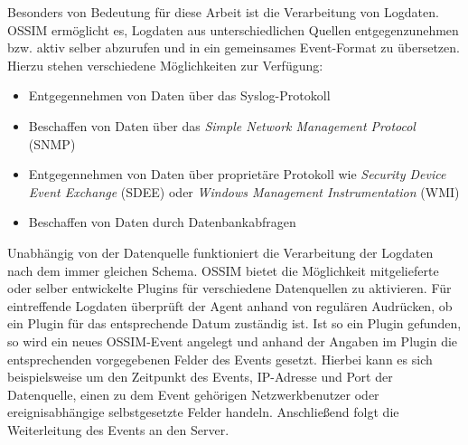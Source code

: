 \label{subsec_state_siem_parsing}

Besonders von Bedeutung für diese Arbeit ist die Verarbeitung von Logdaten. OSSIM ermöglicht es, Logdaten aus unterschiedlichen Quellen entgegenzunehmen bzw. aktiv selber abzurufen und in ein gemeinsames Event-Format zu übersetzen. Hierzu stehen verschiedene Möglichkeiten zur Verfügung:

\begin{itemize}
  \item Entgegennehmen von Daten über das Syslog-Protokoll
  \item Beschaffen von Daten über das \textit{Simple Network Management Protocol} (SNMP)
  \item Entgegennehmen von Daten über proprietäre Protokoll wie \textit{Security Device Event Exchange} (SDEE) oder \textit{Windows Management Instrumentation} (WMI)
  \item Beschaffen von Daten durch Datenbankabfragen 
\end{itemize}

Unabhängig von der Datenquelle funktioniert die Verarbeitung der Logdaten nach dem immer gleichen Schema. OSSIM bietet die Möglichkeit mitgelieferte oder selber entwickelte Plugins für verschiedene Datenquellen zu aktivieren. Für eintreffende Logdaten überprüft der Agent anhand von regulären Audrücken, ob ein Plugin für das entsprechende Datum zuständig ist. Ist so ein Plugin gefunden, so wird ein neues OSSIM-Event angelegt und anhand der Angaben im Plugin die entsprechenden vorgegebenen Felder des Events gesetzt. Hierbei kann es sich beispielsweise um den Zeitpunkt des Events, IP-Adresse und Port der Datenquelle, einen zu dem Event gehörigen Netzwerkbenutzer oder ereignisabhängige selbstgesetzte Felder handeln. Anschließend folgt die Weiterleitung des Events an den Server.
